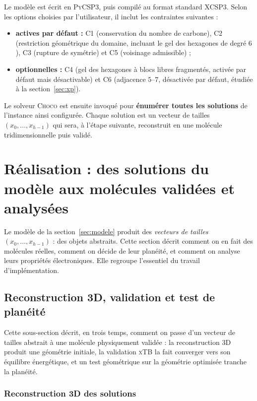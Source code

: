 \documentclass[11pt,a4paper]{article}
\newcommand{\xtb}{\textsc{xTB}}
\begin{document}
Le modèle est écrit en \textsc{PyCSP3}, puis compilé au format standard
XCSP3. Selon les options choisies par l'utilisateur, il inclut les
contraintes suivantes :
\begin{itemize}
  \item \textbf{actives par défaut :} C1 (conservation du nombre de carbone), C2
    (restriction géométrique du domaine, incluant le gel des hexagones
    de degré $6$), C3 (rupture de symétrie) et C5 (voisinage
    admissible) ;
  \item \textbf{optionnelles :} C4 (gel des hexagones à blocs libres
    fragmentés, activée par défaut mais désactivable) et C6 (adjacence
    $5$--$7$, désactivée par défaut, étudiée à la section~\ref{sec:xp}).
\end{itemize}

Le solveur \textsc{Choco} est ensuite invoqué pour \textbf{énumérer toutes les
solutions} de l'instance ainsi configurée. Chaque solution est un vecteur
de tailles $(x_0, \dots, x_{h-1})$ qui sera, à l'étape suivante,
reconstruit en une molécule tridimensionnelle puis validé.

\section{Réalisation : des solutions du modèle aux molécules validées et analysées}
\label{sec:realisation}

Le modèle de la section~\ref{sec:modele} produit des \emph{vecteurs de tailles}
$(x_0, \dots, x_{h-1})$ : des objets abstraits. Cette section décrit comment on
en fait des molécules réelles, comment on décide de leur planéité, et comment on
analyse leurs propriétés électroniques. Elle regroupe l'essentiel du travail
d'implémentation.

\subsection{Reconstruction 3D, validation et test de planéité}
\label{sec:reconstruction-validation}

Cette sous-section décrit, en trois temps, comment on passe d'un vecteur
de tailles abstrait à une molécule physiquement validée : la
reconstruction 3D produit une géométrie initiale, la validation \xtb{}
la fait converger vers son équilibre énergétique, et un test géométrique
sur la géométrie optimisée tranche la planéité.

\subsubsection{Reconstruction 3D des solutions}
\label{sec:reconstruction}
\end{document}

